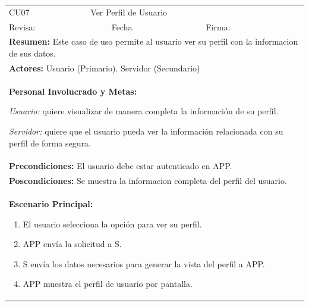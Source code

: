 \begin{longtable}{|l|p{5.5cm}|l|p{2cm}|l|p{1.9cm}|} \hline
    \cellcolor{grisOscuro} CU07 & \multicolumn{4}{|l|}{  \cellcolor{grisOscuro} Ver Perfil de Usuario} &  \cellcolor{grisClaro}\multirow{2}{1cm}{} \\ \cline{1-5}
    \cellcolor{grisOscuro} Revisa: &  \cellcolor{grisClaro} &  \cellcolor{grisOscuro} Fecha &  \cellcolor{grisClaro} &  \cellcolor{grisOscuro} Firma: & \cellcolor{grisClaro} \\ \hline
    \multicolumn{6}{|p{15cm}|}{ \textbf{Resumen: } Este caso de uso permite al usuario ver su perfil con la informacion de sus datos.

    } \\ \hline

    \multicolumn{6}{|p{15cm}|}{ \textbf{Actores: } Usuario (Primario). Servidor (Secundario)

    } \\ \hline

    \multicolumn{6}{|p{15cm}|}{ \textbf{Personal Involucrado y Metas: }
    
    \emph{Usuario:} quiere visualizar de manera completa la información de su perfil.

    \emph{Servidor:} quiere que el usuario pueda ver la información relacionada con su perfil de forma segura.

    } \\ \hline

    \multicolumn{6}{|p{15cm}|}{ \textbf{Precondiciones: } El usuario debe estar autenticado en APP.

    } \\ \hline

    \multicolumn{6}{|p{15cm}|}{ \textbf{Poscondiciones: } Se muestra la informacion completa del perfil del usuario.

    } \\ \hline

    \multicolumn{6}{|p{15cm}|}{ \textbf{Escenario Principal: }

    \begin{enumerate}
        \item El usuario selecciona la opción para ver su perfil.
        \item APP envía la solicitud a S.
        \item S envía los datos necesarios para generar la vista del perfil a APP.
        \item APP muestra el perfil de usuario por pantalla.
    \end{enumerate}

}
\end{longtable}
